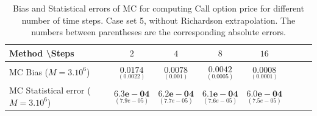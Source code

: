 \documentclass[11pt]{article}
\begin{document}
\begin{table}[h!]
	\centering
	\begin{tabular}{l*{6}{c}r}
		Method \textbackslash  Steps            & $2$ & $4$ & $8$ & $16$  \\
		\hline
		MC Bias ($M=3.10^6$)   & 	$ \underset{(    0.0022)}{\mathbf{0.0174}}$  & $\underset{(0.001)}{\mathbf{0.0078}}$  & $\underset{(0.0005)}{\mathbf{0.0042}}$ & $\underset{(0.0001)}{\mathbf{0.0008}}$\\ 
		
		MC Statistical error ($M=3.10^6$)  &  $\underset{(   7.9e-05)} {\mathbf{6.3e-04}}$  & $\underset{(7.7e-05)} {\mathbf{6.2e-04}}$  & $\underset{(7.6e-05)} {\mathbf{6.1e-04 }}$ & $\underset{(7.5e-05)} {\mathbf{6.0e-04}}$	\\
		
		\hline
	\end{tabular}
	\caption{Bias and Statistical errors of MC   for computing Call option price  for different number of time steps. Case set 5, without Richardson extrapolation. The numbers between parentheses are the corresponding absolute errors.}
	\label{Bias and Statistical errors of MC ($M=10^6$)  for computing Call option price  for different number of time steps. Case set 5, without Richardson extrapolation. The numbers between parentheses are the corresponding absolute errors.}
\end{table}
\end{document}

